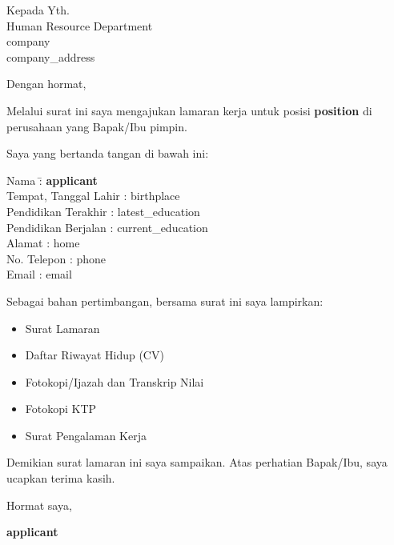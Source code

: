 \documentclass[11pt,a4paper]{letter}
\begin{document}
\onehalfspacing

\begin{letter}{%
Kepada Yth.\\
Human Resource Department\\
{{company}}\\ %
{{company_address}} %
}

\opening{Dengan hormat,}

	Melalui surat ini saya mengajukan lamaran kerja untuk posisi \textbf{ {{position}} } di perusahaan yang Bapak/Ibu pimpin.

Saya yang bertanda tangan di bawah ini:

\begin{tabbing}
Nama \hspace{3cm} \= : \textbf{ {{applicant}} } \\
Tempat, Tanggal Lahir \> : {{birthplace}} \\
Pendidikan Terakhir \> : {{latest_education}} \\
Pendidikan Berjalan \> : {{current_education}} \\
Alamat \> : {{home}} \\
No. Telepon \> : {{phone}} \\
Email \> : {{email}}
\end{tabbing}

Sebagai bahan pertimbangan, bersama surat ini saya lampirkan:
\begin{itemize}
\item Surat Lamaran
\item Daftar Riwayat Hidup (CV)
\item Fotokopi/Ijazah dan Transkrip Nilai
\item Fotokopi KTP
\item Surat Pengalaman Kerja
\end{itemize}

Demikian surat lamaran ini saya sampaikan. Atas perhatian Bapak/Ibu, saya ucapkan terima kasih.

\closing{Hormat saya,}

\vspace{1.5cm}

\textbf{ {{applicant}} }

\end{letter}
\end{document}
